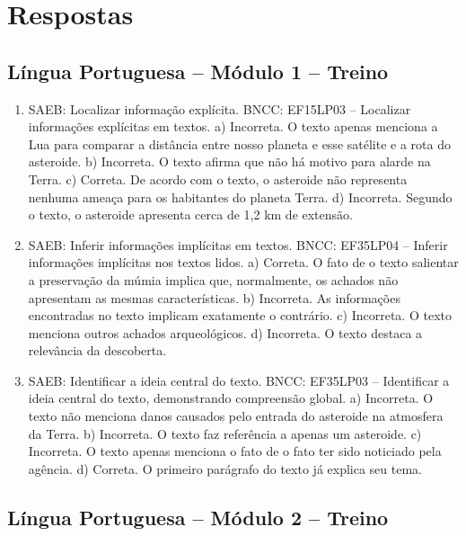 \chapter{Respostas}
\pagestyle{plain}
\footnotesize

\pagecolor{gray!40}

\section*{Língua Portuguesa – Módulo 1 – Treino}

\begin{enumerate}
\item SAEB: Localizar informação explícita.
BNCC: EF15LP03 – Localizar informações explícitas em textos.
 a) Incorreta. O texto apenas menciona a Lua para comparar a distância
entre nosso planeta e esse satélite e a rota do asteroide.
b) Incorreta. O texto afirma que não há motivo para alarde na Terra.
c) Correta. De acordo com o texto, o asteroide não representa nenhuma
ameaça para os habitantes do planeta Terra.
d) Incorreta. Segundo o texto, o asteroide apresenta cerca de 1,2 km de
extensão.

\item
SAEB: Inferir informações implícitas em textos.
BNCC: EF35LP04 – Inferir informações implícitas nos textos lidos.
a) Correta. O fato de o texto salientar a preservação da múmia implica
que, normalmente, os achados não apresentam as mesmas características.
b) Incorreta. As informações encontradas no texto implicam exatamente o
contrário.
c) Incorreta. O texto menciona outros achados arqueológicos.
d) Incorreta. O texto destaca a relevância da descoberta.


\item
SAEB: Identificar a ideia central do texto.
BNCC: EF35LP03 – Identificar a ideia central do texto, demonstrando compreensão
global.
a) Incorreta. O texto não menciona danos causados pelo entrada do
asteroide na atmosfera da Terra.
b) Incorreta. O texto faz referência a apenas um asteroide.
c) Incorreta. O texto apenas menciona o fato de o fato ter sido
noticiado pela agência.
d) Correta. O primeiro parágrafo do texto já explica seu tema.
\end{enumerate}

\section*{Língua Portuguesa – Módulo 2 – Treino}

